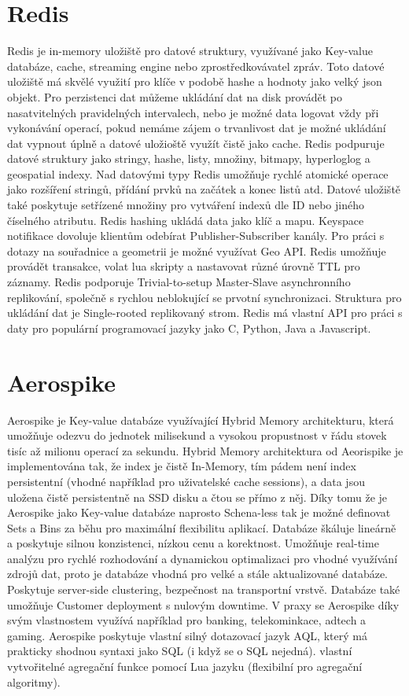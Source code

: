 \documentclass[czech,bachelor,dept460,male,csharp,cpdeclaration]{diploma}
\begin{document}
	\section{Redis}
	
	Redis\cite{redis} je in-memory uložiště pro datové struktury, využívané jako Key-value databáze, cache, streaming engine nebo zprostředkovávatel zpráv. Toto datové uložiště má skvělé využití pro klíče v podobě hashe a hodnoty jako velký json objekt. Pro perzistenci dat můžeme ukládání dat na disk provádět po nasatvitelných pravidelných intervalech, nebo je možné data logovat vždy při vykonávání operací, pokud nemáme zájem o trvanlivost dat je možné ukládání dat vypnout úplně a datové uložioště využít čistě jako cache. Redis podpuruje datové struktury jako stringy, hashe, listy, množiny, bitmapy, hyperloglog a geospatial indexy. Nad datovými typy Redis umožňuje rychlé atomické operace jako rozšíření stringů, přídání prvků na začátek a konec listů atd. Datové uložiště také poskytuje setřízené množiny pro vytváření indexů dle ID nebo jiného číselného atributu. Redis hashing ukládá data jako klíč a mapu. Keyspace notifikace dovoluje klientům odebírat Publisher-Subscriber kanály. Pro práci s dotazy na souřadnice a geometrii je možné využívat Geo API. Redis umožňuje provádět transakce, volat lua skripty a nastavovat různé úrovně TTL pro záznamy. Redis podporuje Trivial-to-setup Master-Slave asynchronního replikování, společně s rychlou neblokující se prvotní synchronizaci. Struktura pro ukládání dat je Single-rooted replikovaný strom. Redis má vlastní API pro práci s daty pro populární programovací jazyky jako C, Python, Java a Javascript.
			
	\section{Aerospike}
	
	Aerospike\cite{aerospike} je Key-value databáze využívající Hybrid Memory architekturu\cite{hybmem-arch}, která umožňuje odezvu do jednotek milisekund a vysokou propustnost v řádu stovek tisíc až milionu operací za sekundu. Hybrid Memory architektura od Aeorispike je implementována tak, že index je čistě In-Memory, tím pádem není index persistentní (vhodné například pro uživatelské cache sessions), a data jsou uložena čistě persistentně na SSD disku a čtou se přímo z něj. Díky tomu že je Aerospike jako Key-value databáze naprosto Schena-less tak je možné definovat Sets a Bins za běhu pro maximální flexibilitu aplikací. Databáze škáluje lineárně a poskytuje silnou konzistenci, nízkou cenu a korektnost. Umožňuje real-time analýzu pro rychlé rozhodování a dynamickou optimalizaci pro vhodné využívání zdrojů dat, proto je databáze vhodná pro velké a stále aktualizované databáze. Poskytuje server-side clustering, bezpečnost na transportní vrstvě. Databáze také umožňuje Customer deployment s nulovým downtime. V praxy se Aerospike díky svým vlastnostem využívá například pro banking, telekominkace, adtech a gaming. Aerospike poskytuje vlastní silný dotazovací jazyk AQL\cite{aql}, který má prakticky shodnou syntaxi jako SQL (i když se o SQL nejedná). vlastní vytvořitelné agregační funkce pomocí Lua jazyku (flexibilní pro agregační algoritmy).
	
\end{document}
